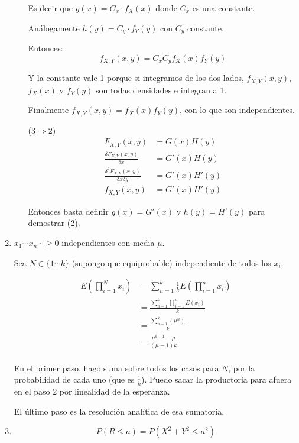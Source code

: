 \begin{enumerate}
\begin{itemize}
				Es decir que $g(x) = C_x\cdot f_X(x)$ donde $C_x$ es una constante.
				
				Análogamente $h(y) = C_y\cdot f_Y(y)$ con $C_y$ constante.
				
				Entonces:
				$$f_{X,Y}(x,y) = C_xC_yf_X(x)f_Y(y)$$
				
				Y la constante vale 1 porque si integramos de los dos lados, $f_{X,Y}(x,y)$, $f_X(x)$ y $f_Y(y)$ son todas densidades e integran a 1.
				
				Finalmente $f_{X,Y}(x,y) = f_X(x)f_Y(y)$, con lo que son independientes.
				
			\item[($3\Rightarrow 2$)]
				\begin{align*}
					F_{X,Y}(x,y)									& = G(x)H(y)	\\
					\frac{\delta F_{X,Y}(x,y)}{\delta x}			& = G'(x)H(y)	\\
					\frac{\delta^2 F_{X,Y}(x,y)}{\delta x \delta y}	& = G'(x)H'(y)	\\
					f_{X,Y}(x,y)									& = G'(x)H'(y)
				\end{align*}
				
				Entonces basta definir $g(x) = G'(x)$ y $h(y) = H'(y)$ para demostrar (2).
		\end{itemize}
		
	\item
		$x_1 \cdots x_n \cdots \geq 0$ independientes con media $\mu$.
		
		Sea $N \in \{1\cdots k\}$ (supongo que equiprobable) independiente de todos los $x_i$.
		
		\begin{align*}
			E(\prod_{i=1}^N x_i)	& = \sum_{n=1}^k \frac{1}{k}E(\prod_{i=1}^n x_i) \\
									& = \frac{\sum_{n=1}^k \prod_{i=1}^n E(x_i)}{k} \\
									& = \frac{\sum_{n=1}^k (\mu ^n)}{k} \\
									& = \frac{\mu^{k+1} - \mu}{(\mu - 1)k} \\
		\end{align*}
		
		En el primer paso, hago suma sobre todos los casos para $N$, por la probabilidad de cada uno (que es $\frac{1}{k}$). Puedo sacar la productoria para afuera en el paso 2 por linealidad de la esperanza.
		
		El último paso es la resolución analítica de esa sumatoria.
		
	\item
		$$P(R \leq a) = P(X^2 + Y^2 \leq a^2)$$
		

\end{enumerate}
